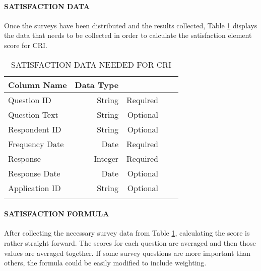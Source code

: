 \documentclass[SDSUThesis.tex]{subfiles}
\begin{document}
            \paragraph{SATISFACTION DATA}
                Once the surveys have been distributed and the results collected, Table
                \ref{tab:satisfactiondata} displays the data that needs to be collected 
                in order to calculate the satisfaction element score for CRI.
                \begin{longtable}{@{}l rr rr}
                    \toprule%
                     \centering%
                     {\bfseries Column Name}
                     & {\bfseries Data Type}
                     &  \\
                    
                    \cmidrule[0.4pt](r{0.125em}){1-1}%
                    \cmidrule[0.4pt](lr{0.125em}){2-2}%
                    \cmidrule[0.4pt](l{0.125em}){3-3}%
                    \endhead
                    
                    Question ID & String  & Required \\
                    \myrowcolour%
                    Question Text & String  & Optional \\
                    Respondent ID & String & Optional \\
                    \myrowcolour%
                    Frequency Date & Date & Required \\
                    Response & Integer & Required \\
                    \myrowcolour%
                    Response Date & Date & Optional \\
                    Application ID & String & Optional \\
                    
                    \bottomrule
                    
                    \caption{SATISFACTION DATA NEEDED FOR CRI}
                    \label{tab:satisfactiondata}
                \end{longtable}
            
            \paragraph{SATISFACTION FORMULA}
                After collecting the necessary survey data from Table \ref{tab:satisfactiondata},
                calculating the score is rather straight forward.
                The scores for each question are averaged and then those
                values are averaged together.  If some survey questions
                are more important than others, the formula could be
                easily modified to include weighting.  
            
\end{document}
